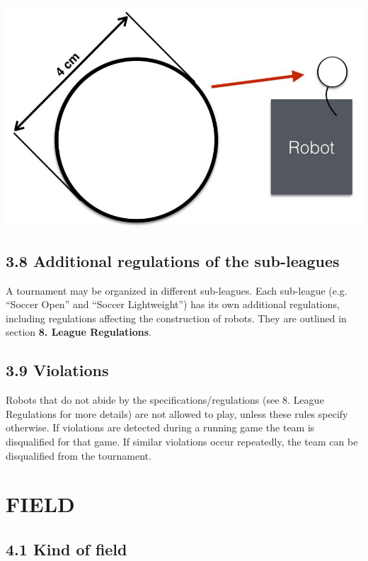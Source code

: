 \documentclass{article}
\begin{document}
\includegraphics[width=1\textwidth]{media/image4.jpeg}

\textbf{}

\subsection{3.8 Additional regulations of the sub-leagues \label{ref-026}}

A tournament may be organized in different sub-leagues. Each sub-league (e.g. ``\textcolor{color-5}{Soccer Open}'' and ``\textcolor{color-5}{Soccer Lightweight}'') \textcolor{color-5}{has} its own additional regulations, including regulations affecting the construction of robots. \textcolor{color-5}{They are outlined in section} \textbf{\textcolor{color-5}{8. League Regulations}}\textcolor{color-5}{.}

\subsection{3.9 Violations \label{ref-027}}

Robots that do not abide by the specifications/regulations \textcolor{color-5}{(see 8. League Regulations for more details)} are not allowed to play, \textcolor{color-5}{unless these rules specify otherwise}. If violations are detected during a running game the team is disqualified for that game. If similar violations occur repeatedly, the team can be disqualified from the tournament. 

\section{FIELD \label{ref-028}}

\subsection{4.1 Kind of field \label{ref-029}}
\end{document}
